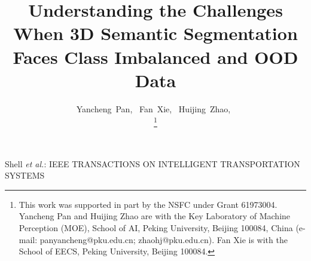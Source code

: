 \documentclass[journal]{IEEEtran}
\begin{document}
\title{\LARGE \bf
	Understanding the Challenges When 3D Semantic Segmentation Faces Class Imbalanced and OOD Data}
%
%
%

\author{Yancheng~Pan,~
	    Fan~Xie,~
		Huijing~Zhao,~
	
\thanks{This work was supported in part by the NSFC under
	Grant 61973004. Yancheng Pan and Huijing Zhao are with
	the Key Laboratory of Machine Perception (MOE), School of AI, Peking
	University, Beijing 100084, China (e-mail: panyancheng@pku.edu.cn; zhaohj@pku.edu.cn). Fan Xie is with the School of EECS, Peking
	University, Beijing 100084.}

}%


%
{Shell \MakeLowercase{\textit{et al.}}: IEEE TRANSACTIONS ON INTELLIGENT TRANSPORTATION SYSTEMS}

\maketitle

\end{document}
